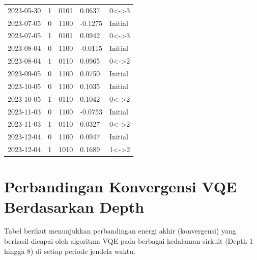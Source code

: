{\begin{longtable}{lllll}
2023-05-30 & 1 & 0101 & 0.0637 & 0<->3 \\
2023-07-05 & 0 & 1100 & -0.1275 & Initial \\
2023-07-05 & 1 & 0101 & 0.0942 & 0<->3 \\
2023-08-04 & 0 & 1100 & -0.0115 & Initial \\
2023-08-04 & 1 & 0110 & 0.0965 & 0<->2 \\
2023-09-05 & 0 & 1100 & 0.0750 & Initial \\
2023-10-05 & 0 & 1100 & 0.1035 & Initial \\
2023-10-05 & 1 & 0110 & 0.1042 & 0<->2 \\
2023-11-03 & 0 & 1100 & -0.0753 & Initial \\
2023-11-03 & 1 & 0110 & 0.0327 & 0<->2 \\
2023-12-04 & 0 & 1100 & 0.0947 & Initial \\
2023-12-04 & 1 & 1010 & 0.1689 & 1<->2 \\
\end{longtable}
}

\section{Perbandingan Konvergensi VQE Berdasarkan Depth}

Tabel berikut menunjukkan perbandingan energi akhir (konvergensi) yang berhasil dicapai oleh algoritma VQE pada berbagai kedalaman sirkuit (Depth 1 hingga 8) di setiap periode jendela waktu. 

